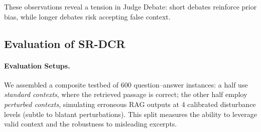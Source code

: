 \documentclass[11pt]{article}
\begin{document}


These observations reveal a tension in Judge Debate: short debates reinforce prior bias, while longer debates risk accepting false context. 


\subsection{Evaluation of SR-DCR}
\label{sec:sc_evaluation}

\paragraph{Evaluation Setups.} We assembled a composite testbed of 600 question–answer instances:  a half use \emph{standard contexts}, where the retrieved passage is correct; the other half employ \emph{perturbed contexts}, simulating erroneous RAG outputs at 4 calibrated disturbance levels (subtle to blatant perturbations).  This split measures the ability to leverage valid context and the robustness to misleading excerpts.
\end{document}
